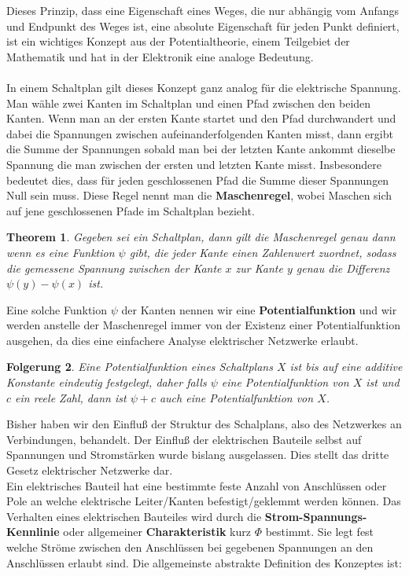 \documentclass[11pt,a4paper,leqno]{report}
\newtheorem{theorem}{Theorem}[chapter]
\newtheorem{corollary}[theorem]{Folgerung}
\numberwithin{equation}{chapter}
\begin{document}
Dieses Prinzip, dass eine Eigenschaft eines Weges, die nur abh\"angig vom Anfangs und Endpunkt des Weges ist, eine absolute Eigenschaft f\"ur jeden Punkt definiert, ist ein wichtiges Konzept aus der Potentialtheorie, einem Teilgebiet der Mathematik und hat in der Elektronik eine analoge Bedeutung.
\\
\\
In einem Schaltplan gilt dieses Konzept ganz analog f\"ur die elektrische Spannung.
Man w\"ahle zwei Kanten im Schaltplan und einen Pfad zwischen den beiden Kanten. Wenn man an der ersten Kante startet und den Pfad durchwandert und dabei die Spannungen zwischen aufeinanderfolgenden Kanten misst, dann ergibt die Summe der Spannungen sobald man bei der letzten Kante ankommt dieselbe Spannung die man zwischen der ersten und letzten Kante misst. Insbesondere bedeutet dies, dass f\"ur jeden geschlossenen Pfad die Summe dieser Spannungen Null sein muss.
Diese Regel nennt man die \textbf{Maschenregel}, wobei Maschen sich auf jene geschlossenen Pfade im Schaltplan bezieht.
\begin{theorem}
	Gegeben sei ein Schaltplan, dann gilt die Maschenregel genau dann wenn es eine Funktion $\psi$ gibt, die jeder Kante einen Zahlenwert zuordnet, sodass die gemessene Spannung zwischen der Kante $x$ zur Kante $y$ genau die Differenz $\psi(y)-\psi(x)$ ist.
\end{theorem}
\noindent
Eine solche Funktion $\psi$ der Kanten nennen wir eine \textbf{Potentialfunktion} und wir werden anstelle der Maschenregel immer von der Existenz einer Potentialfunktion ausgehen, da dies eine einfachere Analyse elektrischer Netzwerke erlaubt.
\begin{corollary}
	Eine Potentialfunktion eines Schaltplans $X$ ist bis auf eine additive Konstante eindeutig festgelegt, daher falls $\psi$ eine Potentialfunktion von $X$ ist und $c$ ein reele Zahl, dann ist $\psi + c$ auch eine Potentialfunktion von $X$.
\end{corollary}
\noindent
Bisher haben wir den Einflu\ss{} der Struktur des Schalplans, also des Netzwerkes an Verbindungen, behandelt. Der Einflu\ss{} der elektrischen Bauteile selbst auf Spannungen und Stromst\"arken wurde bislang ausgelassen. Dies stellt das dritte Gesetz elektrischer Netzwerke dar.\\
Ein elektrisches Bauteil hat eine bestimmte feste Anzahl von Anschl\"ussen oder Pole an welche elektrische Leiter/Kanten befestigt/geklemmt werden k\"onnen. Das Verhalten eines elektrischen Bauteiles wird durch die \textbf{Strom-Spannungs-Kennlinie} oder allgemeiner \textbf{Charakteristik} kurz $\Phi$ bestimmt. Sie legt fest welche Str\"ome zwischen den Anschl\"ussen bei gegebenen Spannungen an den Anschl\"ussen erlaubt sind. Die allgemeinste abstrakte Definition des Konzeptes ist:
\end{document}
